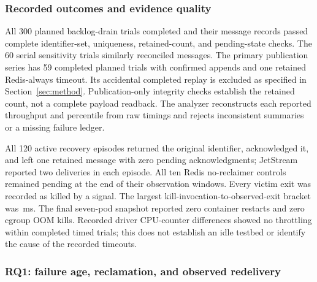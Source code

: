 \subsubsection{Recorded outcomes and evidence quality}
All 300 planned backlog-drain trials completed and their \MainMessages{} message records passed complete identifier-set, uniqueness, retained-count, and pending-state checks. The 60 serial sensitivity trials similarly reconciled \SerialMessages{} messages. The primary publication series has 59 completed planned trials with \TimedMessages{} confirmed appends and one retained Redis-always timeout. Its accidental completed replay is excluded as specified in Section~\ref{sec:method}. Publication-only integrity checks establish the retained count, not a complete payload readback. The analyzer reconstructs each reported throughput and percentile from raw timings and rejects inconsistent summaries or a missing failure ledger.

All 120 active recovery episodes returned the original identifier, acknowledged it, and left one retained message with zero pending acknowledgments; JetStream reported two deliveries in each episode. All ten Redis no-reclaimer controls remained pending at the end of their observation windows. Every victim exit was recorded as killed by a signal. The largest kill-invocation-to-observed-exit bracket was \KillBracket{}\,ms. The final seven-pod snapshot reported zero container restarts and zero cgroup OOM kills. Recorded driver CPU-counter differences showed no throttling within completed timed trials; this does not establish an idle testbed or identify the cause of the recorded timeouts.

\subsubsection{RQ1: failure age, reclamation, and observed redelivery}

\begin{table}[htbp]
\centering\small

\caption{Failure-to-redelivery latency for all recovery configurations. Each row contains ten killed-consumer episodes. $\Delta(1-\alpha)$ is a nominal reference based on the scheduled age after client receipt, not a verified server-side lower bound. Ranges contain the minimum and maximum observed episode.}
\label{tab:recovery}
\end{table}

